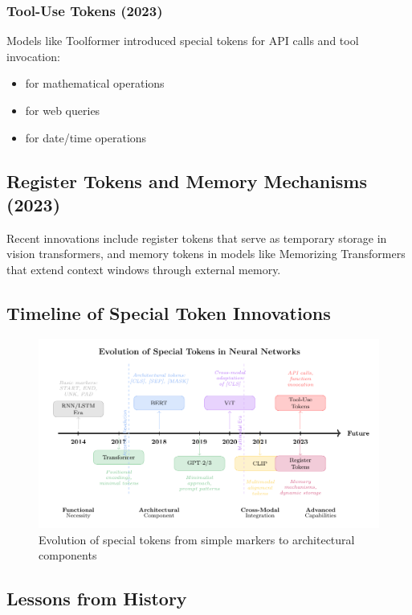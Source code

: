 \subsubsection{Tool-Use Tokens (2023)}
Models like Toolformer \citep{schick2023toolformer} introduced special tokens for API calls and tool invocation:
\begin{itemize}
\item {} for mathematical operations
\item {} for web queries
\item {} for date/time operations
\end{itemize}

\subsection{Register Tokens and Memory Mechanisms (2023)}

Recent innovations include register tokens \citep{darcet2023vision} that serve as temporary storage in vision transformers, and memory tokens in models like Memorizing Transformers \citep{wu2022memorizing} that extend context windows through external memory.

\subsection{Timeline of Special Token Innovations}

\begin{figure}[h]
\centering
\includegraphics[width=\textwidth]{part1/chapter01/fig_timeline}
\caption{Evolution of special tokens from simple markers to architectural components}
\end{figure}

\subsection{Lessons from History}

